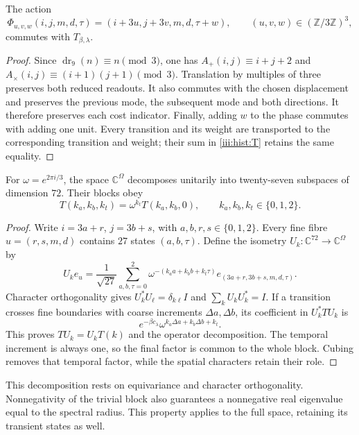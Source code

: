 \begin{proposition}
\label{iii:hist:equivarianza}
The action
\[
 \Phi_{u,v,w}(i,j,m,d,\tau)
 =(i+3u,j+3v,m,d,\tau+w),\qquad
 (u,v,w)\in(\mathbb Z/3\mathbb Z)^3,
\]
commutes with $T_{\beta,\lambda}$.
\end{proposition}
\begin{proof}
Since $\operatorname{dr}_9(n)\equiv n\pmod3$, one has
$A_+(i,j)\equiv i+j+2$ and
$A_\times(i,j)\equiv(i+1)(j+1)\pmod3$.
Translation by multiples of three preserves both reduced readouts.
It also commutes with the chosen displacement and preserves the previous
mode, the subsequent mode and both directions. It therefore preserves
each cost indicator. Finally, adding $w$ to the phase commutes with adding
one unit. Every transition and its weight are transported to the
corresponding transition and weight; their sum in \eqref{iii:hist:T}
retains the same equality.
\end{proof}

\begin{theorem}
\label{iii:hist:descomposicion}
For $\omega=e^{2\pi i/3}$, the space $\mathbb C^\Omega$ decomposes
unitarily into twenty-seven subspaces of dimension $72$. Their blocks obey
\[
 T(k_a,k_b,k_t)=\omega^{k_t}T(k_a,k_b,0),
 \qquad k_a,k_b,k_t\in\{0,1,2\}.
\]
\end{theorem}
\begin{proof}
Write $i=3a+r$, $j=3b+s$, with $a,b,r,s\in\{0,1,2\}$.
Every fine fibre $u=(r,s,m,d)$ contains $27$ states $(a,b,\tau)$.
Define the isometry $U_k:\mathbb C^{72}\to\mathbb C^\Omega$ by
\[
 U_ke_u=\frac1{\sqrt{27}}
 \sum_{a,b,\tau=0}^2
 \omega^{-(k_aa+k_bb+k_t\tau)}e_{(3a+r,3b+s,m,d,\tau)}.
\]
Character orthogonality gives $U_k^*U_\ell=\delta_{k\ell}I$ and
$\sum_kU_kU_k^*=I$. If a transition crosses fine boundaries with coarse
increments $\Delta a,\Delta b$, its coefficient in $U_k^*TU_k$ is
\[
 e^{-\beta c_\lambda}\omega^{k_a\Delta a+k_b\Delta b+k_t}.
\]
This proves $TU_k=U_kT(k)$ and the operator decomposition. The temporal
increment is always one, so the final factor is common to the whole block.
Cubing removes that temporal factor, while the spatial characters retain
their role.
\end{proof}

This decomposition rests on equivariance and character orthogonality.
Nonnegativity of the trivial block also guarantees a nonnegative real
eigenvalue equal to the spectral radius. This property applies to the full
space, retaining its transient states as well.

